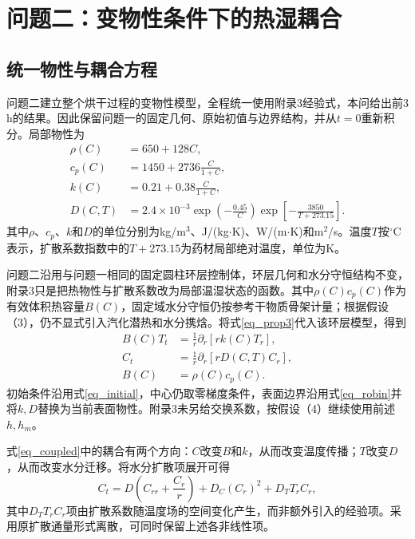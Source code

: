 \section{问题二：变物性条件下的热湿耦合}
\subsection{统一物性与耦合方程}
问题二建立整个烘干过程的变物性模型，全程统一使用附录3经验式，本问给出前3 h的结果。因此保留问题一的固定几何、原始初值与边界结构，并从$t=0$重新积分。局部物性为
\begin{equation}\label{eq_prop3}
\begin{aligned}
\rho(C)&=650+128C,\\
c_p(C)&=1450+2736\frac{C}{1+C},\\
k(C)&=0.21+0.38\frac{C}{1+C},\\
D(C,T)&=2.4\times10^{-3}\exp\!\left(-\frac{0.45}{C}\right)
\exp\!\left[-\frac{3850}{T+273.15}\right].
\end{aligned}
\end{equation}
其中$\rho$、$c_p$、$k$和$D$的单位分别为kg/m$^3$、J/(kg$\cdot$K)、W/(m$\cdot$K)和m$^2$/s。温度$T$按$^\circ$C表示，扩散系数指数中的$T+273.15$为药材局部绝对温度，单位为K。

问题二沿用与问题一相同的固定圆柱环层控制体，环层几何和水分守恒结构不变，附录3只是把热物性与扩散系数改为局部温湿状态的函数。其中$\rho(C)c_p(C)$作为有效体积热容量$B(C)$，固定域水分守恒仍按参考干物质骨架计量；根据假设（3），仍不显式引入汽化潜热和水分携焓。将式\eqref{eq_prop3}代入该环层模型，得到
\begin{equation}\label{eq_coupled}
\begin{aligned}
B(C)T_t&=\frac1r\partial_r[rk(C)T_r],\\
C_t&=\frac1r\partial_r[rD(C,T)C_r],\\
B(C)&=\rho(C)c_p(C).
\end{aligned}
\end{equation}
初始条件沿用式\eqref{eq_initial}，中心仍取零梯度条件，表面边界沿用式\eqref{eq_robin}并将$k,D$替换为当前表面物性。附录3未另给交换系数，按假设（4）继续使用前述$h,h_m$。

式\eqref{eq_coupled}中的耦合有两个方向：$C$改变$B$和$k$，从而改变温度传播；$T$改变$D$，从而改变水分迁移。将水分扩散项展开可得
\begin{equation}\label{eq_moisture_expanded_q2}
C_t=D\left(C_{rr}+\frac{C_r}{r}\right)+D_C(C_r)^2+D_TT_rC_r,
\end{equation}
其中$D_TT_rC_r$项由扩散系数随温度场的空间变化产生，而非额外引入的经验项。采用原扩散通量形式离散，可同时保留上述各非线性项。

